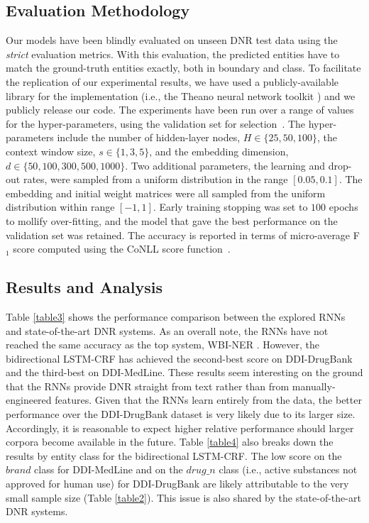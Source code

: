 \documentclass[11pt,letterpaper]{article}
\begin{document}
\subsection{Evaluation Methodology}
Our models have been blindly evaluated on unseen DNR test data using the \textit{strict} evaluation metrics. With this evaluation, the predicted entities have to match the ground-truth entities exactly, both in boundary and class. To facilitate the replication of our experimental results, we have used a publicly-available library for the implementation (i.e., the Theano neural network toolkit \cite{bergstra2010theano}) and we publicly release our code. The experiments have been run over a range of values for the hyper-parameters, using the validation set for selection~\cite{bergstra2012random}. The hyper-parameters include the number of hidden-layer nodes, $H \in \{25, 50, 100\}$, the context window size, $s \in \{1, 3, 5\}$, and the embedding dimension, $d \in \{50, 100, 300, 500, 1000\}$. Two additional parameters, the learning and drop-out rates, were sampled from a uniform distribution in the range $[0.05, 0.1]$. The embedding and initial weight matrices were all sampled from the uniform distribution within range $[-1, 1]$. Early training stopping was set to $100$ epochs to mollify over-fitting, and the model that gave the best performance on the validation set was retained. The accuracy is reported in terms of micro-average F$_1$ score computed using the CoNLL score function~\cite{Nadeau:07}.

\subsection{Results and Analysis}
\label{ssec:results and analysis}
Table \ref{table3} shows the performance comparison between the explored RNNs and state-of-the-art DNR systems. As an overall note, the RNNs have not reached the same accuracy as the top system, WBI-NER \cite{huber2013wbi}. However, the bidirectional LSTM-CRF has achieved the second-best score on DDI-DrugBank and the third-best on DDI-MedLine. These results seem interesting on the ground that the RNNs provide DNR straight from text rather than from manually-engineered features. Given that the RNNs learn entirely from the data, the better performance over the DDI-DrugBank dataset is very likely due to its larger size. Accordingly, it is reasonable to expect higher relative performance should larger corpora become available in the future. Table \ref{table4} also breaks down the results by entity class for the bidirectional LSTM-CRF. The low score on the $brand$ class for DDI-MedLine and on the $drug\_n$ class (i.e., active substances not approved for human use) for DDI-DrugBank  are likely attributable to the very small sample size (Table \ref{table2}). This issue is also shared by the state-of-the-art DNR systems. 
\end{document}
